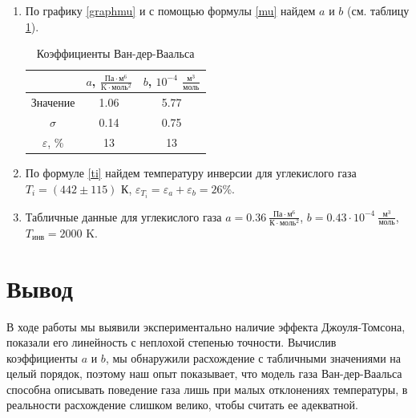 \documentclass[12pt]{article}
\begin{document}
\begin{enumerate}
        \item По графику \ref{graphmu} и с помощью формулы \ref{mu} найдем $a$ и $b$ 
        (см. таблицу \ref{tabcoeffs}).
        \begin{table}[h]
            \centering
            \begin{tabular}{|c|c|c|}
            \hline
              & $a$, $\frac{\text{Па}\cdot\text{м}^6}{\text{K}\cdot\text{моль}^2}$    & $b$, $10^{-4}$ $\frac{\text{м}^3}{\text{моль}}$    \\ \hline
            Значение & 1.06 & 5.77 \\ \hline
            $\sigma$ & 0.14 & 0.75 \\ \hline
            $\varepsilon$, \% & 13   & 13   \\ \hline
            \end{tabular}
            \caption{Коэффициенты Ван-дер-Ваальса}
            \label{tabcoeffs}
        \end{table}
        
        \item По формуле \ref{ti} найдем температуру инверсии для углекислого
        газа $T_i = (442\pm115)$ К, $\varepsilon_{T_i} = \varepsilon_a + \varepsilon_b = 26$\%.
        
        \item Табличные данные для углекислого газа $a = 0.36\ \frac{\text{Па} \cdot \text{м}^6}{\text{К} \cdot \text{моль}^2}$,
        $b = 0.43 \cdot 10^{-4} \ \frac{\text{м}^3}{\text{моль}}$, $T_{\text{инв}} = 2000$ K.
    \end{enumerate}
    
    \section{Вывод}
    В ходе работы мы выявили экспериментально наличие эффекта Джоуля-Томсона,
    показали его линейность с неплохой степенью точности. Вычислив коэффициенты
    $a$ и $b$, мы обнаружили расхождение с табличными значениями на целый порядок,
    поэтому наш опыт показывает, что модель газа Ван-дер-Ваальса способна описывать
    поведение газа лишь при малых отклонениях температуры, в реальности
    расхождение слишком велико, чтобы считать ее адекватной.
\end{document}
